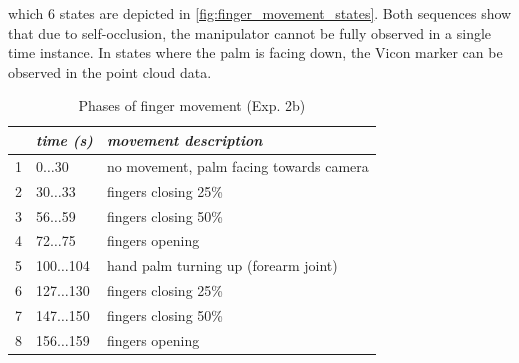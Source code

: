 which 6 states are depicted in \cref{fig:finger_movement_states}. Both sequences show that due to self-occlusion, the manipulator cannot be fully observed in a single time instance. In states where the palm is facing down, the Vicon marker can be observed in the point cloud data.

\begin{table}[h]
\centering
\begin{tabular}{|c|l|l|}
\hline
 & \emph{time (s)} & \emph{movement description} \\
\hline
1 & 0$\dots$30 & no movement, palm facing towards camera \\
\hline
2 & 30$\dots$33 & fingers closing 25\% \\
\hline
3 & 56$\dots$59 & fingers closing 50\% \\
\hline
4 & 72$\dots$75 & fingers opening \\
\hline
5 & 100$\dots$104 & hand palm turning up (forearm joint) \\
\hline
6 & 127$\dots$130 & fingers closing 25\% \\
\hline
7 & 147$\dots$150 & fingers closing 50\% \\
\hline
8 & 156$\dots$159 & fingers opening \\
\hline
\end{tabular}
\caption{Phases of finger movement (Exp. 2b)}
\label{tab:vic_finger_movement_phases}
\end{table}

\setlength{\imgwidth}{0.26\textwidth}

